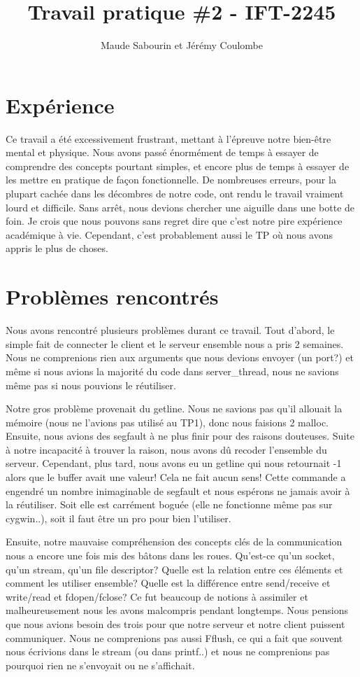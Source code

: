 \documentclass[11pt]{article}
\title{Travail pratique \#2 - IFT-2245}
\author{Maude Sabourin et Jérémy Coulombe}
\begin{document}
\maketitle
\section{Expérience}
Ce travail a été excessivement frustrant, mettant à l’épreuve notre bien-être mental et physique. Nous avons passé énormément de temps à essayer de comprendre des concepts pourtant simples, et encore plus de temps à essayer de les mettre en pratique de façon fonctionnelle. De nombreuses erreurs, pour la plupart cachée dans les décombres de notre code, ont rendu le travail vraiment lourd et difficile. Sans arrêt, nous devions chercher une aiguille dans une botte de foin. Je crois que nous pouvons sans regret dire que c’est notre pire expérience académique à vie. Cependant, c’est probablement aussi le TP où nous avons appris le plus de choses.

\section{Problèmes rencontrés}
Nous avons rencontré plusieurs problèmes durant ce travail. Tout d’abord, le simple fait de connecter le client et le serveur ensemble nous a pris 2 semaines. Nous ne comprenions rien aux arguments que nous devions envoyer (un port?) et même si nous avions la majorité du code dans server_thread, nous ne savions même pas si nous pouvions le réutiliser. 

Notre gros problème provenait du getline. Nous ne savions pas qu’il allouait la mémoire (nous ne l’avions pas utilisé au TP1), donc nous faisions 2 malloc. Ensuite, nous avions des segfault à ne plus finir pour des raisons douteuses. Suite à notre incapacité à trouver la raison, nous avons dû recoder l'ensemble du serveur. Cependant, plus tard, nous avons eu un getline qui nous retournait -1 alors que le buffer avait une valeur! Cela ne fait aucun sens! Cette commande a engendré un nombre inimaginable de segfault et nous espérons ne jamais avoir à la réutiliser. Soit elle est carrément boguée (elle ne fonctionne même pas sur cygwin..), soit il faut être un pro pour bien l’utiliser.

Ensuite, notre mauvaise compréhension des concepts clés de la communication nous a encore une fois mis des bâtons dans les roues. Qu’est-ce qu’un socket, qu’un stream, qu’un file descriptor? Quelle est la relation entre ces éléments et comment les utiliser ensemble? Quelle est la différence entre send/receive et write/read et fdopen/fclose? Ce fut beaucoup de notions à assimiler et malheureusement nous les avons malcompris pendant longtemps. Nous pensions que nous avions besoin des trois pour que notre serveur et notre client puissent communiquer. Nous ne comprenions pas aussi Fflush, ce qui a fait que souvent nous écrivions dans le stream (ou dans printf..) et nous ne comprenions pas pourquoi rien ne s’envoyait ou ne s’affichait.
\end{document}

